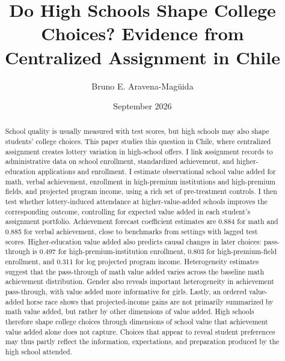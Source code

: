\documentclass[a4paper, article, english, oneside, unknownkeysallowed, 12pt]{memoir}
\title{Do High Schools Shape College Choices? Evidence from Centralized Assignment in Chile}
\author{ Bruno E. Aravena-Magüida}
\date{September 2026}
\begin{document}
\maketitle

\begin{abstract}
School quality is usually measured with test scores, but high schools may also shape students' college choices.
This paper studies this question in Chile, where centralized assignment creates lottery variation in high-school offers.
I link assignment records to administrative data on school enrollment, standardized achievement, and higher-education applications and enrollment.
I estimate observational school value added for math, verbal achievement, enrollment in high-premium institutions and high-premium fields, and projected program income, using a rich set of pre-treatment controls.
I then test whether lottery-induced attendance at higher-value-added schools improves the corresponding outcome, controlling for expected value added in each student's assignment portfolio.
Achievement forecast coefficient estimates are 0.884 for math and 0.885 for verbal achievement, close to benchmarks from settings with lagged test scores.
Higher-education value added also predicts causal changes in later choices: pass-through is 0.497 for high-premium-institution enrollment, 0.803 for high-premium-field enrollment, and 0.311 for log projected program income.
Heterogeneity estimates suggest that the pass-through of math value added varies across the baseline math achievement distribution.
Gender also reveals important heterogeneity in achievement pass-through, with value added more informative for girls.
Lastly, an ordered value-added horse race shows that projected-income gains are not primarily summarized by math value added, but rather by other dimensions of value added.
High schools therefore shape college choices through dimensions of school value that achievement value added alone does not capture.
Choices that appear to reveal student preferences may thus partly reflect the information, expectations, and preparation produced by the high school attended.
\end{abstract}

\setcounter{tocdepth}{2}
\renewcommand\contentsname{}
\end{document}
